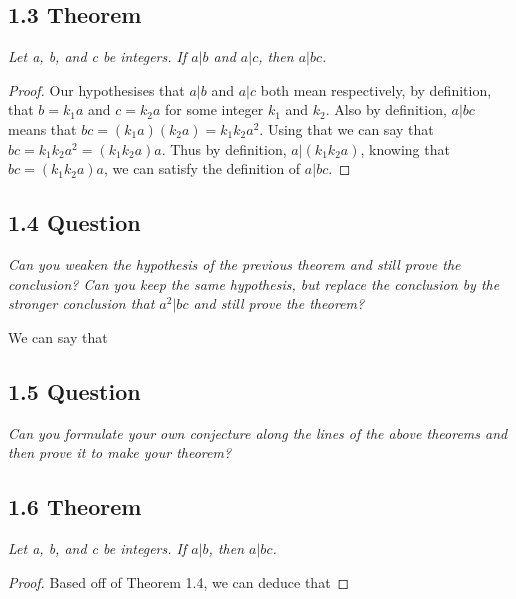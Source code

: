 \documentclass{article}
\begin{document}
\subsection*{1.3 Theorem} 
\quad \textit{Let a, b, and c be integers. If $a \vert b$ and $a \vert c$, then $a \vert bc$.}

\begin{proof}
Our hypothesises that $a \vert b$ and $a \vert c$ both mean respectively, by definition, that $b = k_1a$ and $c = k_2a$ for some integer $k_1$ and $k_2$. Also by definition, $a \vert bc$ means that $bc = (k_1a)(k_2a) = k_1k_2a^2$. Using that we can say that $bc = k_1k_2a^2 = (k_1k_2a)a$. Thus by definition, $a \vert (k_1k_2a)$, knowing that $bc= (k_1k_2a)a$, we can satisfy the definition of $a \vert bc$.
\end{proof}

\subsection*{1.4 Question} 
\quad \textit{Can you weaken the hypothesis of the previous theorem and still prove the conclusion? Can you keep the same hypothesis, but replace the conclusion by the stronger conclusion that $a^2 \vert bc$ and still prove the theorem?}

We can say that 

\subsection*{1.5 Question} 
\quad \textit{Can you formulate your own conjecture along the lines of the above theorems and then prove it to make your theorem?}

\subsection*{1.6 Theorem} 
\quad \textit{Let a, b, and c be integers. If $a \vert b$, then $a \vert bc$.}

\begin{proof}
Based off of Theorem 1.4, we can deduce that 
\end{proof}
\end{document}
